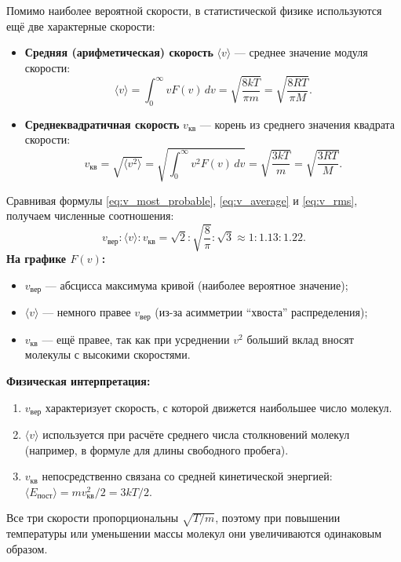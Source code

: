 \begin{definition}
Помимо наиболее вероятной скорости, в статистической физике используются ещё две характерные скорости:
\begin{itemize}
    \item \textbf{Средняя (арифметическая) скорость} $\langle v \rangle$ --- среднее значение модуля скорости:
    \begin{equation}
        \langle v \rangle = \int_0^\infty v F(v) \, dv = \sqrt{\frac{8kT}{\pi m}} = \sqrt{\frac{8RT}{\pi M}}. \label{eq:v_average}
    \end{equation}
    \item \textbf{Среднеквадратичная скорость} $v_{\text{кв}}$ --- корень из среднего значения квадрата скорости:
    \begin{equation}
        v_{\text{кв}} = \sqrt{\langle v^2 \rangle} = \sqrt{\int_0^\infty v^2 F(v) \, dv} = \sqrt{\frac{3kT}{m}} = \sqrt{\frac{3RT}{M}}. \label{eq:v_rms}
    \end{equation}
\end{itemize}
\end{definition}

\begin{property}
Сравнивая формулы \eqref{eq:v_most_probable}, \eqref{eq:v_average} и \eqref{eq:v_rms}, получаем численные соотношения:
\begin{equation}
    v_{\text{вер}} : \langle v \rangle : v_{\text{кв}} = \sqrt{2} : \sqrt{\frac{8}{\pi}} : \sqrt{3} \approx 1 : 1.13 : 1.22. \label{eq:speeds_ratio}
\end{equation}
\textbf{На графике $F(v)$:}
\begin{itemize}
    \item $v_{\text{вер}}$ --- абсцисса максимума кривой (наиболее вероятное значение);
    \item $\langle v \rangle$ --- немного правее $v_{\text{вер}}$ (из-за асимметрии ``хвоста'' распределения);
    \item $v_{\text{кв}}$ --- ещё правее, так как при усреднении $v^2$ больший вклад вносят молекулы с высокими скоростями.
\end{itemize}
\end{property}

\begin{remark}
\textbf{Физическая интерпретация:}
\begin{enumerate}
    \item $v_{\text{вер}}$ характеризует скорость, с которой движется наибольшее число молекул.
    \item $\langle v \rangle$ используется при расчёте среднего числа столкновений молекул (например, в формуле для длины свободного пробега).
    \item $v_{\text{кв}}$ непосредственно связана со средней кинетической энергией: $\langle E_{\text{пост}} \rangle = m v_{\text{кв}}^2 / 2 = 3kT/2$.
\end{enumerate}
Все три скорости пропорциональны $\sqrt{T/m}$, поэтому при повышении температуры или уменьшении массы молекул они увеличиваются одинаковым образом.
\end{remark}

